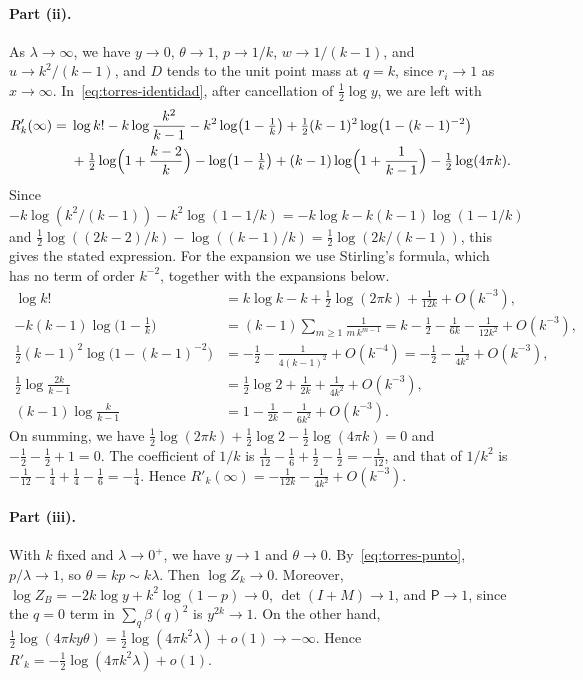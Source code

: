 \paragraph{Part (ii).}
As $\lambda\to\infty$, we have $y\to0$, $\theta\to1$, $p\to1/k$, $w\to1/(k-1)$, and $u\to k^2/(k-1)$, and
$D$
tends to the unit point mass at $q=k$, since $r_i\to1$ as $x\to\infty$. In~\eqref{eq:torres-identidad},
after
cancellation of $\frac12\log y$, we are left with
\[
\begin{aligned}
 R'_k(\infty)={}&\log k!-k\log\frac{k^2}{k-1}-k^2\log\bigl(1-\tfrac1k\bigr)
 +\tfrac12(k-1)^2\log\bigl(1-(k-1)^{-2}\bigr)\\
 &+\tfrac12\log\Bigl(1+\frac{k-2}k\Bigr)-\log\bigl(1-\tfrac1k\bigr)
 +(k-1)\log\Bigl(1+\frac1{k-1}\Bigr)-\tfrac12\log(4\pi k).
\end{aligned}
\]
Since $-k\log(k^2/(k-1))-k^2\log(1-1/k)=-k\log k-k(k-1)\log(1-1/k)$ and
$\frac12\log((2k-2)/k)-\log((k-1)/k)=\frac12\log(2k/(k-1))$, this gives the stated expression. For the
expansion we use Stirling's formula, which has no term of order $k^{-2}$, together with the expansions
below.
\[
\begin{aligned}
 \log k!&=k\log k-k+\tfrac12\log(2\pi k)+\tfrac1{12k}+O(k^{-3}),\\
 -k(k-1)\log\bigl(1-\tfrac1k\bigr)&=(k-1)\sum_{m\ge1}\frac1{m\,k^{m-1}}
 =k-\tfrac12-\tfrac1{6k}-\tfrac1{12k^2}+O(k^{-3}),\\
 \tfrac12(k-1)^2\log\bigl(1-(k-1)^{-2}\bigr)&=-\tfrac12-\tfrac1{4(k-1)^2}+O(k^{-4})
 =-\tfrac12-\tfrac1{4k^2}+O(k^{-3}),\\
 \tfrac12\log\frac{2k}{k-1}&=\tfrac12\log2+\tfrac1{2k}+\tfrac1{4k^2}+O(k^{-3}),\\
 (k-1)\log\frac k{k-1}&=1-\tfrac1{2k}-\tfrac1{6k^2}+O(k^{-3}).
\end{aligned}
\]
On summing, we have $\frac12\log(2\pi k)+\frac12\log2-\frac12\log(4\pi k)=0$ and $-\frac12-\frac12+1=0$. The
coefficient
of $1/k$ is $\frac1{12}-\frac16+\frac12-\frac12=-\frac1{12}$, and that of $1/k^2$ is
$-\frac1{12}-\frac14+\frac14-\frac16=-\frac14$. Hence $R'_k(\infty)=-\frac1{12k}-\frac1{4k^2}+O(k^{-3})$.

\paragraph{Part (iii).}
With $k$ fixed and $\lambda\to0^+$, we have $y\to1$ and $\theta\to0$. By~\eqref{eq:torres-punto},
$p/\lambda\to1$, so $\theta=kp\sim k\lambda$. Then $\log Z_k\to0$. Moreover,
$\log Z_B=-2k\log y+k^2\log(1-p)\to0$, $\det(I+M)\to1$, and $\mathsf P\to1$, since the $q=0$ term in
$\sum_q\beta(q)^2$ is $y^{2k}\to1$. On the other hand,
$\frac12\log(4\pi ky\theta)=\frac12\log(4\pi k^2\lambda)+o(1)\to-\infty$. Hence
$R'_k=-\frac12\log(4\pi k^2\lambda)+o(1)$.


